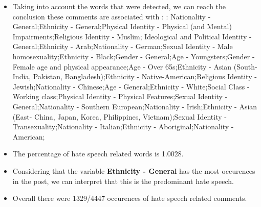 \documentclass[11pt]{article}
\begin{document}
\begin{itemize}\item Taking into account the words that were detected, we can reach the conclusion these comments are associated with : : Nationality - General;Ethnicity - General;Physical Identity - Physical (and Mental) Impairments;Religious Identity - Muslim; Ideological and Political Identity - General;Ethnicity - Arab;Nationality - German;Sexual Identity - Male homosexuality;Ethnicity - Black;Gender - General;Age - Youngsters;Gender - Female age and physical appearance;Age - Over 65s;Ethnicity - Asian (South- India, Pakistan, Bangladesh);Ethnicity - Native-American;Religious Identity - Jewish;Nationality - Chinese;Age - General;Ethnicity - White;Social Class - Working class;Physical Identity - Physical Features;Sexual Identity - General;Nationality - Southern European;Nationality - Irish;Ethnicity - Asian (East- China, Japan, Korea, Philippines, Vietnam);Sexual Identity - Transexuality;Nationality - Italian;Ethnicity - Aboriginal;Nationality - American;%

\item The percentage of hate speech related words is 1.0028.

\item Considering that the variable \textbf{Ethnicity - General} has the most occurences in the post, we can interpret that this is the predominant hate speech.

\item Overall there were 1329/4447 occurences of hate speech related comments.\end{itemize}
\end{document}
